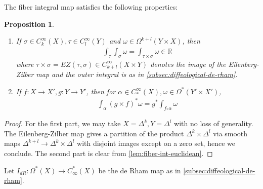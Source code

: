 \documentclass{scrartcl}
\theoremstyle{plain}
\newtheorem{proposition}[theorem]{Proposition}
\theoremstyle{definition}
\newcommand{\R}{\mathbb R}
\begin{document}
The fiber integral map satisfies the following properties:
\begin{proposition}
    \begin{enumerate}
        \item If $\sigma\in C^\infty_k(X), \tau\in C^\infty_l(Y)$ and $\omega\in\Omega^{k+l}(Y\times X)$, then
        \begin{align*}
            \int_\tau\int_\sigma\omega = \int_{\tau\times\sigma}\omega \in \R
        \end{align*}
        where $\tau\times\sigma = EZ(\tau,\sigma)\in C^\infty_{k+l}(X\times Y)$ denotes the image of the Eilenberg-Zilber map and the outer integral is as in \cref{subsec:diffeological-de-rham}. 
        \item If $f\colon X\to X', g\colon Y\to Y'$, then for $\alpha\in C^\infty_*(X), \omega\in \Omega^*(Y'\times X')$,
        \begin{align*}
            \int_\alpha (g\times f)^*\omega = g^*\int_{f_*\alpha}\omega
        \end{align*}
\end{enumerate}
\end{proposition}
\begin{proof}
    For the first part, we may take $X=\Delta^k, Y=\Delta^l$ with no loss of generality. The Eilenberg-Zilber map gives a partition of the product $\Delta^{k}\times\Delta^l$ via smooth maps $\Delta^{k+l}\to\Delta^k\times\Delta^l$ with disjoint images except on a zero set, hence we conclude. The second part is clear from \cref{lem:fiber-int-euclidean}. 
\end{proof}

Let $I_{dR}\colon \Omega^*(X)\to C_\infty^*(X)$ be the de Rham map as in \cref{subsec:diffeological-de-rham}.
\end{document}

